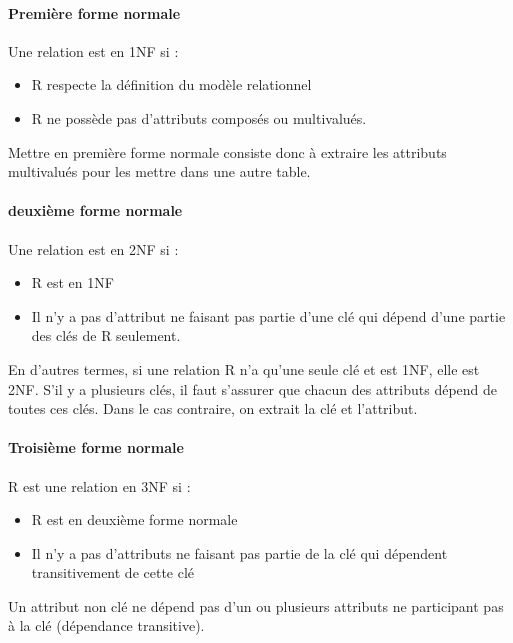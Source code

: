 \paragraph{Première forme normale}
Une relation est en 1NF si : 
\begin{itemize}
	\item R respecte la définition du modèle relationnel
	\item R ne possède pas d'attributs composés ou multivalués.
\end{itemize}
Mettre en première forme normale consiste donc à extraire les attributs multivalués pour les mettre dans une autre table.

\paragraph{deuxième forme normale}
Une relation est en 2NF si : 
\begin{itemize}
	\item R est en 1NF
	\item Il n'y a pas d'attribut ne faisant pas partie d'une clé qui dépend 
	d'une partie des clés de R seulement.
\end{itemize}
En d'autres termes, si une relation R n'a qu'une seule clé et est 1NF, 
elle est 2NF. S'il y a plusieurs clés, il faut s'assurer que chacun des attributs 
dépend de toutes ces clés. Dans le cas contraire, on extrait la clé et l'attribut.


\paragraph{Troisième forme normale}
R est une relation en 3NF si : 
\begin{itemize}
	\item R est en deuxième forme normale
	\item Il n'y a pas d'attributs ne faisant pas partie de la clé qui dépendent 
	transitivement de cette clé
\end{itemize}

Un attribut non clé ne dépend pas d'un ou plusieurs attributs ne participant pas à la clé (dépendance transitive).
